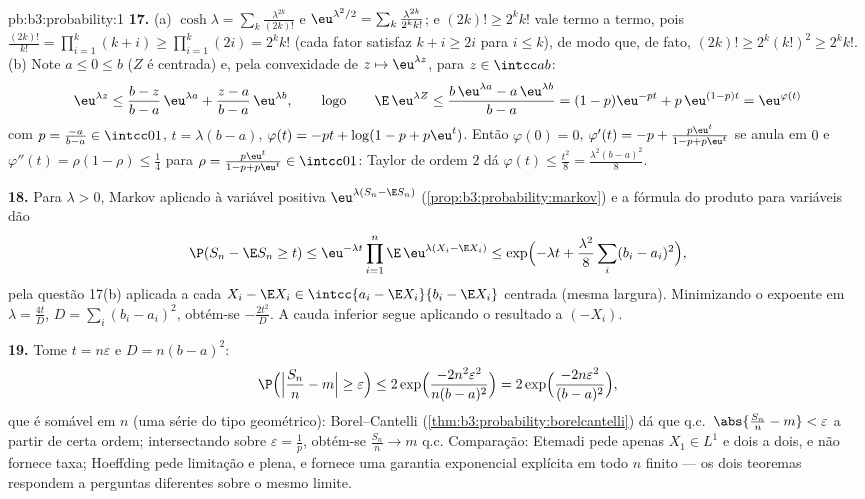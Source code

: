 \begin{solution}{pb:b3:probability:1}
\textbf{17.} (a) $\cosh\lambda =
\sum_k\frac{\lambda^{2k}}{(2k)!}$ e $\eu^{\lambda^2/2} =
\sum_k\frac{\lambda^{2k}}{2^kk!}$; e $(2k)! \geq 2^kk!$
vale termo a termo, pois $\frac{(2k)!}{k!} =
\prod_{i=1}^k(k + i) \geq \prod_{i=1}^k(2i) = 2^kk!$ (cada
fator satisfaz $k + i \geq 2i$ para $i \leq k$), de modo que,
de fato, $(2k)! \geq 2^k(k!)^2 \geq 2^kk!$. (b) Note $a \leq 0 \leq b$ ($Z$ é
centrada) e, pela convexidade de $z \mapsto \eu^{\lambda z}$,
para $z \in \intcc ab$:
\[
\eu^{\lambda z} \leq \frac{b - z}{b - a}\,\eu^{\lambda a} +
\frac{z - a}{b - a}\,\eu^{\lambda b},
\qquad\text{logo}\qquad
\E\,\eu^{\lambda Z} \leq \frac{b\,\eu^{\lambda a} -
a\,\eu^{\lambda b}}{b - a}
= (1 - p)\eu^{-pt} + p\,\eu^{(1-p)t} = \eu^{\varphi(t)}
\]
com $p = \frac{-a}{b-a} \in \intcc01$, $t = \lambda(b -
a)$, $\varphi(t) = -pt + \log(1 - p + p\eu^t)$. Então
$\varphi(0) = 0$, $\varphi'(t) = -p + \frac{p\eu^t}{1 - p +
p\eu^t}$ se anula em $0$ e $\varphi''(t) = \rho(1 -
\rho) \leq \frac14$ para $\rho = \frac{p\eu^t}{1 - p +
p\eu^t} \in \intcc01$: Taylor de ordem $2$ dá
$\varphi(t) \leq \frac{t^2}8 = \frac{\lambda^2(b-a)^2}8$.

\textbf{18.} Para $\lambda > 0$, Markov aplicado à
variável positiva $\eu^{\lambda(S_n - \E S_n)}$
(\cref{prop:b3:probability:markov}) e a fórmula do produto
para variáveis  dão
\[
\P(S_n - \E S_n \geq t) \leq \eu^{-\lambda
t}\prod_{i=1}^n\E\,\eu^{\lambda(X_i - \E X_i)}
\leq \exp\Bigl(-\lambda t +
\frac{\lambda^2}8\sum_i(b_i - a_i)^2\Bigr),
\]
pela questão 17(b) aplicada a cada $X_i - \E X_i
\in \intcc{a_i - \E X_i}{b_i - \E X_i}$ centrada (mesma largura).
Minimizando o expoente em $\lambda = \frac{4t}{D}$, $D =
\sum_i(b_i - a_i)^2$, obtém-se $-\frac{2t^2}D$. A cauda
inferior segue aplicando o resultado a $(-X_i)$.

\textbf{19.} Tome $t = n\varepsilon$ e $D = n(b - a)^2$:
\[
\P\Bigl(\Bigl|\frac{S_n}n - m\Bigr| \geq \varepsilon\Bigr)
\leq 2\exp\Bigl(\frac{-2n^2\varepsilon^2}{n(b-a)^2}\Bigr)
= 2\exp\Bigl(\frac{-2n\varepsilon^2}{(b-a)^2}\Bigr),
\]
que é somável em $n$ (uma série do tipo geométrico):
Borel--Cantelli (\cref{thm:b3:probability:borelcantelli})
dá que q.c.\ $\abs{\frac{S_n}n - m} < \varepsilon$
a partir de certa ordem; intersectando sobre $\varepsilon = \frac1p$,
obtém-se $\frac{S_n}n \to m$ q.c. Comparação: Etemadi pede
apenas $X_1 \in L^1$ e  dois a dois, e não fornece
taxa; Hoeffding pede limitação e  plena,
e fornece uma garantia exponencial explícita em todo
$n$ finito --- os dois teoremas respondem a perguntas diferentes
sobre o mesmo limite.


\end{solution}
